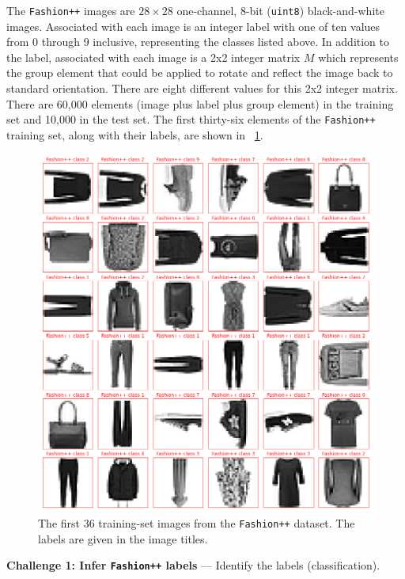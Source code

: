 \documentclass{article}
\renewcommand{\paragraph}[1]{\par\medskip\noindent\textbf{#1} ---}
\newcommand{\figref}[1]{\figurename~\ref{#1}}
\begin{document}
The \texttt{Fashion++} images are $28\times 28$ one-channel, 8-bit (\texttt{uint8}) black-and-white images.
Associated with each image is an integer label with one of ten values from 0 through 9 inclusive, representing the classes listed above.
In addition to the label, associated with each image is a 2x2 integer matrix $M$ which represents the group element that could be applied to rotate and reflect the image back to standard orientation.
There are eight different values for this 2x2 integer matrix.
There are 60,000 elements (image plus label plus group element) in the training set and 10,000 in the test set.
The first thirty-six elements of the \texttt{Fashion++} training set, along with their labels, are shown in \figref{fig:f}.
\begin{figure}[t!]
\includegraphics[width=\textwidth]{../notebooks/Fashion++.png}
\caption{The first 36 training-set images from the \texttt{Fashion++} dataset. The labels are given in the image titles.\label{fig:f}}
\end{figure}

\paragraph{Challenge 1: Infer \texttt{Fashion++} labels}
Identify the labels (classification).
\end{document}
